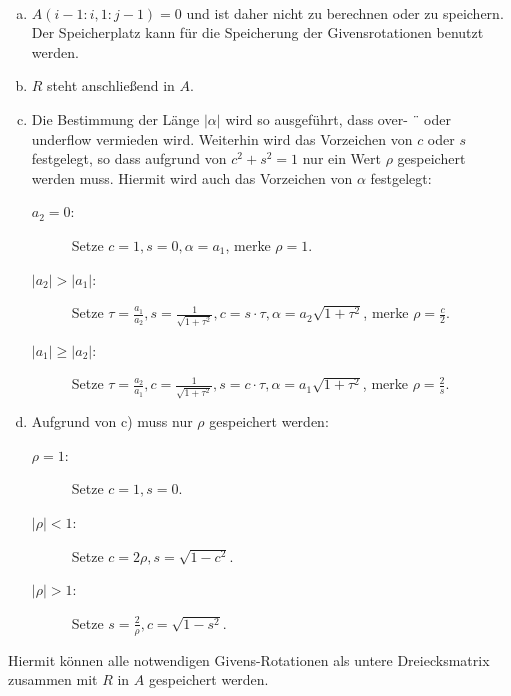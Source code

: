 \begin{Beme}~
  \begin{enumerate}[a)]
  \item $A(i-1 : i, 1 : j-1) = 0$ und ist daher nicht zu berechnen oder
    zu speichern. Der Speicherplatz kann für die Speicherung der
    Givensrotationen benutzt werden.
  \item  $R$ steht anschließend in $A$.
  \item Die Bestimmung der Länge $|\alpha|$ wird so ausgeführt, dass over- ¨
    oder underflow vermieden wird. Weiterhin wird das Vorzeichen
    von $c$ oder $s$ festgelegt, so dass aufgrund von $c^2+s^2=1$ nur
    ein Wert $\rho$ gespeichert werden muss. Hiermit wird auch das
    Vorzeichen von $\alpha$ festgelegt:\\
    \begin{description}
    \item[$a_2=0$:] Setze $c=1, s=0, \alpha = a_1$, merke $\rho=1$.
    \item[$|a_2|>|a_1|$:] Setze $\tau= \frac{a_1}{a_2}, s=\frac{1}{\sqrt{1+\tau^2}}, c=s\cdot\tau, \alpha =a_2\sqrt{1+\tau^2}$, merke $\rho=\frac{c}{2}$.
    \item[$|a_1|\geq|a_2|$:] Setze $\tau= \frac{a_2}{a_1}, c=\frac{1}{\sqrt{1+\tau^2}}, s=c\cdot\tau, \alpha =a_1\sqrt{1+\tau^2}$, merke $\rho=\frac{2}{s}$.
    \end{description}
  \item Aufgrund von c) muss nur $\rho$ gespeichert werden:
    \begin{description}
    \item[$\rho=1$:] Setze $c=1, s=0$.
    \item[$|\rho|<1$:] Setze $c=2\rho , s= \sqrt{1-c^2}$.
    \item[$|\rho|>1$:] Setze $s=\frac{2}{\rho}, c=\sqrt{1-s^2}$.
    \end{description}
  \end{enumerate}
  Hiermit können alle notwendigen Givens-Rotationen als untere
  Dreiecksmatrix zusammen mit $R$ in $A$ gespeichert werden.
\end{Beme}



